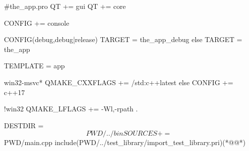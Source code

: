 \label{f000016}    %
\FloatBarrier                                  %
\begin{thebookfilesourceone}[escapeinside={(*@}{@*)},
caption=GoodLuck,
title=\filesourcenumbernameone \thefilesourcenumber
]
#the_app.pro
QT += gui
QT += core

CONFIG += console

CONFIG(debug,debug|release){
    TARGET = the_app_debug
}else{
    TARGET = the_app
}

TEMPLATE = app

win32-msvc*{
    QMAKE_CXXFLAGS += /std:c++latest
}else{
    CONFIG += c++17
}

!win32 {
    QMAKE_LFLAGS += -Wl,-rpath .
}

DESTDIR =  $$PWD/../bin

SOURCES += $$PWD/main.cpp
include($$PWD/../test_library/import_test_library.pri)(*@\marginpar[\hfill\setlength\fboxsep{2pt}\fbox{\footnotesize{\kaishu\parbox{1em}{\setlength{\baselineskip}{2pt}\filesourcenumbernameone}}\footnotesize{\thefilesourcenumber}}]{\setlength\fboxsep{2pt}\fbox{\footnotesize{\kaishu\parbox{1em}{\setlength{\baselineskip}{2pt}\filesourcenumbernameone}}\footnotesize{\thefilesourcenumber}}}@*)\end{thebookfilesourceone}          %
\addtocounter{lstlisting}{-1}   %


